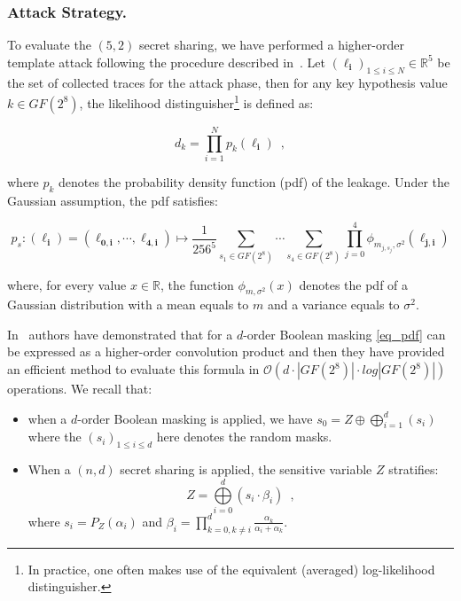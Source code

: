 \documentclass{llncs}
\begin{document}
\subsubsection{Attack Strategy.} To evaluate the $(5,2)$ secret sharing, we have performed a higher-order template attack following the procedure described in~\cite{LPRRT14}. Let $(\boldsymbol{\ell_i})_{1\le i \le N} \in \mathbb{R}^5$ be the set of collected traces for the attack phase, then for any key hypothesis value $k\in GF(2^8)$, the likelihood distinguisher\footnote{In practice, one often makes use of the equivalent (averaged) log-likelihood distinguisher.} is defined as:

\begin{equation*}
d_k= \prod\limits_{i=1}^{N} p_{k}(\boldsymbol{\ell_i}) \enspace,
\end{equation*}    
 
where $p_k$ denotes the probability density function (pdf) of the leakage. Under the Gaussian assumption, the pdf satisfies:   

\begin{equation}
p_s : (\boldsymbol{\ell_i}) = (\boldsymbol{\ell_{0,i}}, \cdots, \boldsymbol{\ell_{4,i}}) \mapsto \frac{1}{256^5} \sum_{s_1 \in GF(2^8)} \cdots \sum_{s_4 \in GF(2^8)} \prod\limits_{j=0}^{4} \phi_{m_{j,s_j}, \sigma^2} (\boldsymbol{\ell_{j,i}})
\label{eq_pdf}
\end{equation} 
 
where, for every value $x \in \mathbb{R}$, the function $\phi_{m,\sigma^2}(x)$ denotes the pdf of a Gaussian distribution with a mean equals to $m$ and a variance equals to $\sigma^2$. 

In~\cite{LPRRT14} authors have demonstrated that for a $d$\myth-order Boolean masking \eqref{eq_pdf} can be expressed as a higher-order convolution product and then they have provided an efficient method to evaluate this formula in $ \mathcal{O}(d \cdot |GF(2^8)| \cdot log|GF(2^8)|)$ operations. 
We recall that:
\begin{itemize}
\item  when a $d$\myth-order Boolean masking is applied, we have $s_0= Z \oplus \bigoplus\limits_{i=1}^{d} (s_i)$ where the $(s_i)_{1 \le i \le d}$ here denotes the random masks.

\item When a $(n,d)$ secret sharing is applied, the sensitive variable $Z$ stratifies: 
\begin{equation}
Z=\bigoplus\limits_{i=0}^{d} (s_i \cdot \beta_i) \enspace,
\label{eq_Z}
\end{equation}
 where $s_i =P_Z(\alpha_i)$ and $\beta_i=\prod\limits_{k=0,k\neq i}^{d} \frac{\alpha_k}{\alpha_i+\alpha_k}$. 
\end{itemize}
\end{document}
